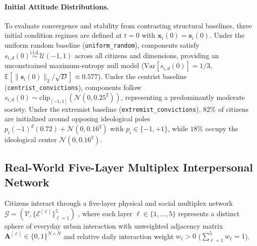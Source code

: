 \documentclass{article}
\begin{document}
\paragraph{Initial Attitude Distributions.}
To evaluate convergence and stability from contrasting structural baselines, three initial condition regimes are defined at $t = 0$ with $\mathbf{x}_i(0) = \mathbf{s}_i(0)$. Under the uniform random baseline (\texttt{uniform\_random}), components satisfy $s_{i,d}(0) \stackrel{\text{i.i.d.}}{\sim} \mathcal{U}(-1, 1)$ across all citizens and dimensions, providing an unconstrained maximum-entropy null model ($\mathrm{Var}[s_{i,d}(0)] = 1/3$, $\mathbb{E}[\|\mathbf{s}_i(0)\|_2/\sqrt{D}] \approx 0.577$). Under the centrist baseline (\texttt{centrist\_convictions}), components follow $s_{i,d}(0) \sim \mathrm{clip}_{[-1,1]}(\mathcal{N}(0, 0.25^2))$, representing a predominantly moderate society. Under the extremist baseline (\texttt{extremist\_convictions}), $82\%$ of citizens are initialized around opposing ideological poles $p_i (-1)^d (0.72) + \mathcal{N}(0, 0.16^2)$ with $p_i \in \{-1, +1\}$, while $18\%$ occupy the ideological center $\mathcal{N}(0, 0.16^2)$.

\subsection{Real-World Five-Layer Multiplex Interpersonal Network}
\label{subsec:multiplex_network}

Citizens interact through a five-layer physical and social multiplex network $\mathcal{G} = (\mathcal{V}, \{\mathcal{E}^{[\ell]}\}_{\ell=1}^5)$ \citep{boccaletti2014structure, kivela2014multilayer}, where each layer $\ell \in \{1, \dots, 5\}$ represents a distinct sphere of everyday urban interaction with unweighted adjacency matrix $\mathbf{A}^{[\ell]} \in \{0, 1\}^{N \times N}$ and relative daily interaction weight $w_\ell > 0$ ($\sum_{\ell=1}^5 w_\ell = 1$).
\end{document}
